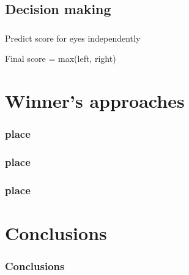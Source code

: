 \documentclass{beamer}
\begin{document}
\subsection{Decision making}

\begin{frame}\frametitle{}
\par Predict score for eyes independently
\par Final score = max(left, right)
\end{frame}





\section{Winner's approaches} 
\begin{frame}\frametitle{ place}
\end{frame}
\begin{frame}\frametitle{ place}
\end{frame}
\begin{frame}\frametitle{ place}
\end{frame}









\section{Conclusions}
\begin{frame}\frametitle{Conclusions}
\end{frame}
\end{document}
